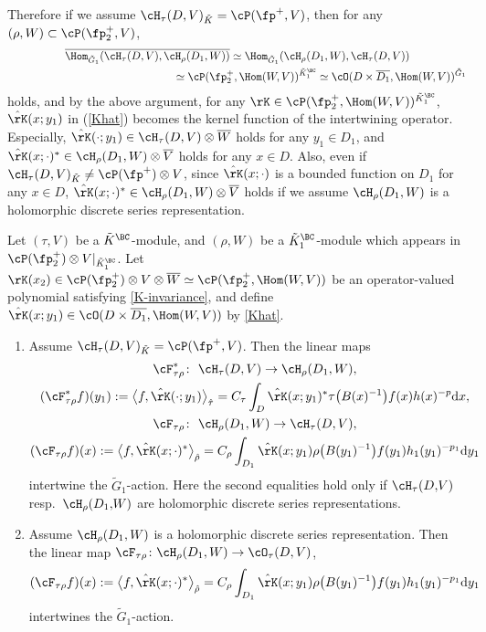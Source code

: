 Therefore if we assume $\cH_\tau(D,V)_{\tilde{K}}=\cP(\fp^+,V)$, then for any $(\rho,W)\subset \cP(\fp^+_2,V)$,
\begin{gather*}
 \overline{\Hom_{\tilde{G}_1}(\cH_\tau(D,V),\cH_\rho(D_1,W))}\simeq \Hom_{\tilde{G}_1}(\cH_\rho(D_1,W),\cH_\tau(D,V)) \\
\hphantom{\overline{\Hom_{\tilde{G}_1}(\cH_\tau(D,V),\cH_\rho(D_1,W))}}{} \simeq \cP(\fp^+_2,\Hom(W,V))^{\tilde{K}^\BC_1}\simeq \cO(D\times \overline{D_1}, \Hom(W,V))^{\tilde{G}_1}
\end{gather*}
holds, and by the above argument,
for any $\rK\in\cP(\fp^+_2,\Hom(W,V))^{\tilde{K}^\BC_1}$, $\hat{\rK}(x;y_1)$ in (\ref{Khat}) becomes
the kernel function of the intertwining operator.
Especially, $\hat{\rK}(\cdot;y_1)\in\cH_\tau(D,V)\otimes \overline{W}$ holds for any $y_1\in D_1$,
and $\hat{\rK}(x;\cdot)^*\in\cH_{\rho}(D_1,W)\otimes \overline{V}$ holds for any $x\in D$.
Also, even if $\cH_\tau(D,V)_{\tilde{K}}\ne\cP(\fp^+)\otimes V$, since $\hat{\rK}(x;\cdot)$ is a bounded function on $D_1$ for any $x\in D$,
$\hat{\rK}(x;\cdot)^*\in\cH_{\rho}(D_1,W)\otimes \overline{V}$ holds
if we assume $\cH_\rho(D_1,W)$ is a holomorphic discrete series representation.
\begin{Corollary}\label{integral_expression}
Let $(\tau,V)$ be a $\tilde{K}^\BC$-module, and $(\rho,W)$ be a $\tilde{K}_1^\BC$-module
which appears in $\cP(\fp^+_2)\otimes V|_{\tilde{K}_1^\BC}$.
Let $\rK(x_2)\in \cP(\fp^+_2)\otimes V\otimes\overline{W}\simeq\cP(\fp^+_2,\Hom(W,V))$ be an operator-valued polynomial
satisfying \eqref{K-invariance}, and define $\hat{\rK}(x;y_1)\in\cO(D\times\overline{D_1},\Hom(W,V))$ by \eqref{Khat}.
\begin{enumerate}\itemsep=0pt
\item[$(1)$] Assume $\cH_\tau(D,V)_{\tilde{K}}=\cP(\fp^+,V)$. Then the linear maps
\begin{gather*}
\cF_{\tau\rho}^*\colon \ \cH_\tau(D,V)\to\cH_\rho(D_1,W), \\
(\cF_{\tau\rho}^*f)(y_1):=\big\langle f,\hat{\rK}(\cdot;y_1)\big\rangle_{\hat{\tau}}
=C_\tau\int_D\hat{\rK}(x;y_1)^*\tau\big(B(x)^{-1}\big)f(x)h(x)^{-p}{\rm d}x, \\
\cF_{\tau\rho}\colon \ \cH_\rho(D_1,W)\to \cH_\tau(D,V), \\
(\cF_{\tau\rho}f)(x):=\big\langle f,\hat{\rK}(x;\cdot)^*\big\rangle_{\hat{\rho}}
=C_\rho\int_{D_1}\hat{\rK}(x;y_1)\rho\big(B(y_1)^{-1}\big)f(y_1)h_1(y_1)^{-p_1}{\rm d}y_1
\end{gather*}
intertwine the $\tilde{G}_1$-action. Here the second equalities hold only if $\cH_\tau(D{,}V)$ resp.~$\cH_\rho(D_1{,}W)$ are holomorphic discrete series representations.
\item[$(2)$] Assume $\cH_\rho(D_1,W)$ is a holomorphic discrete series representation.
Then the linear map $\cF_{\tau\rho}\colon \cH_\rho(D_1,W)\to \cO_\tau(D,V)$,
\begin{gather*} (\cF_{\tau\rho}f)(x):=\big\langle f,\hat{\rK}(x;\cdot)^*\big\rangle_{\hat{\rho}}
=C_\rho\int_{D_1}\hat{\rK}(x;y_1)\rho\big(B(y_1)^{-1}\big)f(y_1)h_1(y_1)^{-p_1}{\rm d}y_1 \end{gather*}
intertwines the $\tilde{G}_1$-action.
\end{enumerate}
\end{Corollary}
